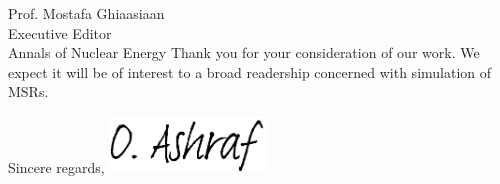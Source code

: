 \documentclass[11pt]{letter} %
\newcommand{\RecipientName}{Prof. Mostafa Ghiaasiaan\xspace}
\newcommand{\RecipientAddress}{Executive Editor\\Annals of Nuclear Energy}
\begin{document}
\begin{letter}{\RecipientName\\
			\RecipientAddress\xspace}
		Thank you for your consideration of our work. We expect it will be of interest
		to a broad readership concerned with simulation of MSRs.\\
		
		
		\closing{Sincere regards,
	\includegraphics[height=1.5cm]{signature.png}\\
}


\end{letter}
\end{document}

